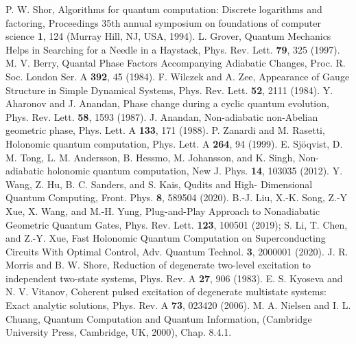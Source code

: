 \documentclass{article}
\begin{document}
\begin{thebibliography}{99}
 P. W. Shor, 
Algorithms for quantum computation:  Discrete logarithms and  factoring, 
Proceedings  35th  annual  symposium  on  foundations  of computer science 
{\bf 1}, 124 (Murray Hill, NJ, USA, 1994). 
 L. Grover, 
Quantum Mechanics Helps in Searching for a Needle in a Haystack, 
Phys. Rev. Lett. {\bf 79}, 325 (1997). 
 M. V. Berry,
Quantal Phase Factors Accompanying Adiabatic Changes, 
Proc. R. Soc. London Ser. A {\bf 392}, 45 (1984).
 F. Wilczek and A. Zee, 
Appearance of Gauge Structure in Simple Dynamical Systems, 
Phys. Rev. Lett. {\bf 52}, 2111 (1984). 
 Y. Aharonov and J. Anandan, 
Phase change during a cyclic quantum evolution, 
Phys. Rev. Lett. {\bf 58}, 1593 (1987). 
 J. Anandan, 
Non-adiabatic non-Abelian geometric phase, 
Phys. Lett. A {\bf 133}, 171  (1988).
 P. Zanardi and M. Rasetti, 
Holonomic quantum computation, 
Phys. Lett. A {\bf 264}, 94 (1999).
 E. Sj\"oqvist, D. M. Tong, L. M. Andersson, B. Hessmo, 
M. Johansson, and K. Singh,  
Non-adiabatic holonomic quantum computation, 
New J. Phys. {\bf 14}, 103035 (2012).
 Y. Wang, Z. Hu, B. C. Sanders, and S. Kais, 
Qudits and High- Dimensional Quantum Computing, 
Front. Phys. {\bf 8}, 589504 (2020).
 B.-J. Liu, X.-K. Song, Z.-Y Xue, X. Wang, and M.-H. Yung, 
Plug-and-Play Approach to Nonadiabatic Geometric Quantum Gates, 
Phys. Rev. Lett. {\bf 123}, 100501 (2019); 
 S. Li, T. Chen, and Z.-Y. Xue, 
Fast Holonomic Quantum Computation on Superconducting Circuits With Optimal Control, 
Adv. Quantum Technol. {\bf 3}, 2000001 (2020). 
 J. R. Morris and B. W. Shore, 
Reduction of degenerate two-level excitation to independent two-state systems, 
Phys. Rev. A {\bf 27}, 906 (1983). 
 E. S. Kyoseva and N. V. Vitanov, 
Coherent pulsed excitation of degenerate multistate systems: Exact analytic solutions, 
Phys. Rev. A {\bf 73}, 023420 (2006).
 M. A. Nielsen and I. L. Chuang, 
Quantum Computation and Quantum Information, 
(Cambridge University Press, Cambridge, UK, 2000), Chap. 8.4.1.
\end{thebibliography}
\end{document}
